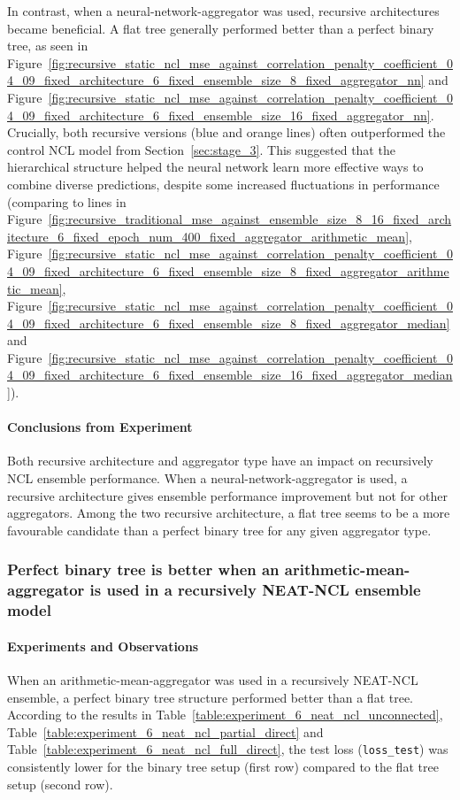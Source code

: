 \documentclass{article}
\begin{document}
In contrast, when a neural-network-aggregator was used, recursive architectures became beneficial. A flat tree generally performed better than a perfect binary tree, as seen in Figure~\ref{fig:recursive_static_ncl_mse_against_correlation_penalty_coefficient_04_09_fixed_architecture_6_fixed_ensemble_size_8_fixed_aggregator_nn} and Figure~\ref{fig:recursive_static_ncl_mse_against_correlation_penalty_coefficient_04_09_fixed_architecture_6_fixed_ensemble_size_16_fixed_aggregator_nn}. Crucially, both recursive versions (blue and orange lines) often outperformed the control NCL model from Section~\ref{sec:stage_3}. This suggested that the hierarchical structure helped the neural network learn more effective ways to combine diverse predictions, despite some increased fluctuations in performance (comparing to lines in Figure~\ref{fig:recursive_traditional_mse_against_ensemble_size_8_16_fixed_architecture_6_fixed_epoch_num_400_fixed_aggregator_arithmetic_mean}, Figure~\ref{fig:recursive_static_ncl_mse_against_correlation_penalty_coefficient_04_09_fixed_architecture_6_fixed_ensemble_size_8_fixed_aggregator_arithmetic_mean}, Figure~\ref{fig:recursive_static_ncl_mse_against_correlation_penalty_coefficient_04_09_fixed_architecture_6_fixed_ensemble_size_8_fixed_aggregator_median} and Figure~\ref{fig:recursive_static_ncl_mse_against_correlation_penalty_coefficient_04_09_fixed_architecture_6_fixed_ensemble_size_16_fixed_aggregator_median}). 

\paragraph{Conclusions from Experiment}
Both recursive architecture and aggregator type have an impact on recursively NCL ensemble performance. When a neural-network-aggregator is used, a recursive architecture gives ensemble performance improvement but not for other aggregators. Among the two recursive architecture, a flat tree seems to be a more favourable candidate than a perfect binary tree for any given aggregator type. 


\subsubsection{Perfect binary tree is better when an arithmetic-mean-aggregator is used in a recursively NEAT-NCL ensemble model}
\paragraph{Experiments and Observations}
When an arithmetic-mean-aggregator was used in a recursively NEAT-NCL ensemble, a perfect binary tree structure performed better than a flat tree. According to the results in Table~\ref{table:experiment_6_neat_ncl_unconnected}, Table~\ref{table:experiment_6_neat_ncl_partial_direct} and Table~\ref{table:experiment_6_neat_ncl_full_direct}, the test loss (\texttt{loss\_test}) was consistently lower for the binary tree setup (first row) compared to the flat tree setup (second row). 
\end{document}
